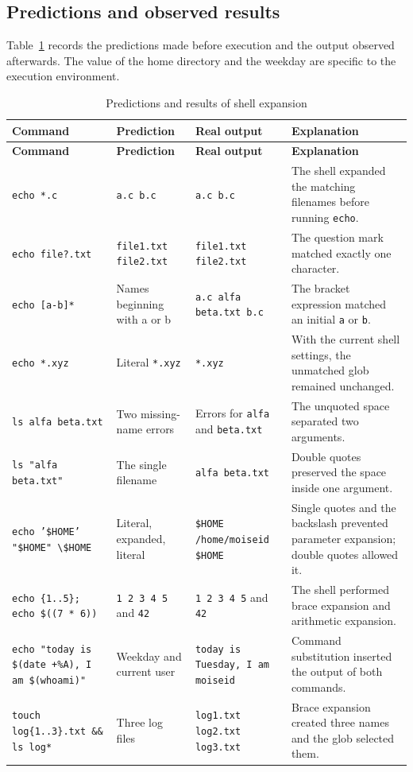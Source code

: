 \documentclass[12pt,a4paper]{article}
\begin{document}
\subsection{Predictions and observed results}

Table~\ref{tab:expansions} records the predictions made before execution and the output observed afterwards. The value of the home directory and the weekday are specific to the execution environment.

\small
\begin{longtable}{|p{}|p{}|p{}|p{}|}
\caption{Predictions and results of shell expansion}\label{tab:expansions}\\
\hline
\textbf{Command} & \textbf{Prediction} & \textbf{Real output} & \textbf{Explanation} \\
\hline
\endfirsthead
\hline
\textbf{Command} & \textbf{Prediction} & \textbf{Real output} & \textbf{Explanation} \\
\hline
\endhead
\texttt{echo *.c} & \texttt{a.c b.c} & \texttt{a.c b.c} & The shell expanded the matching filenames before running \texttt{echo}. \\
\hline
\texttt{echo file?.txt} & \texttt{file1.txt file2.txt} & \texttt{file1.txt file2.txt} & The question mark matched exactly one character. \\
\hline
\texttt{echo [a-b]*} & Names beginning with a or b & \texttt{a.c alfa beta.txt b.c} & The bracket expression matched an initial \texttt{a} or \texttt{b}. \\
\hline
\texttt{echo *.xyz} & Literal \texttt{*.xyz} & \texttt{*.xyz} & With the current shell settings, the unmatched glob remained unchanged. \\
\hline
\texttt{ls alfa beta.txt} & Two missing-name errors & Errors for \texttt{alfa} and \texttt{beta.txt} & The unquoted space separated two arguments. \\
\hline
\texttt{ls "alfa beta.txt"} & The single filename & \texttt{alfa beta.txt} & Double quotes preserved the space inside one argument. \\
\hline
\texttt{echo '\$HOME' "\$HOME" \textbackslash\$HOME} & Literal, expanded, literal & \texttt{\$HOME /home/moiseid \$HOME} & Single quotes and the backslash prevented parameter expansion; double quotes allowed it. \\
\hline
\texttt{echo \{1..5\}; echo \$((7 * 6))} & \texttt{1 2 3 4 5} and \texttt{42} & \texttt{1 2 3 4 5} and \texttt{42} & The shell performed brace expansion and arithmetic expansion. \\
\hline
\texttt{echo "today is \$(date +\%A), I am \$(whoami)"} & Weekday and current user & \texttt{today is Tuesday, I am moiseid} & Command substitution inserted the output of both commands. \\
\hline
\texttt{touch log\{1..3\}.txt \&\& ls log*} & Three log files & \texttt{log1.txt log2.txt log3.txt} & Brace expansion created three names and the glob selected them. \\
\hline
\end{longtable}
\normalsize
\end{document}
